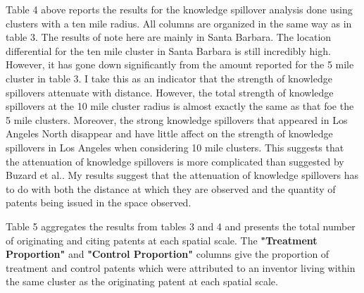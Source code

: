 \documentclass[12pt,letterpaper]{article}
\begin{document}
Table 4 above reports the results for the knowledge spillover analysis done using clusters with a ten mile radius. All columns are organized in the same way as in table 3. The results of note here are mainly in Santa Barbara. The location differential for the ten mile cluster in Santa Barbara is still incredibly high. However, it has gone down significantly from the amount reported for the 5 mile cluster in table 3. I take this as an indicator that the strength of knowledge spillovers attenuate with distance. However, the total strength of knowledge spillovers at the 10 mile cluster radius is almost exactly the same as that foe the 5 mile clusters. Moreover, the strong knowledge spillovers that appeared in Los Angeles North disappear and have little affect on the strength of knowledge spillovers in Los Angeles when considering 10 mile clusters. This suggests that the attenuation of knowledge spillovers is more complicated than suggested by Buzard et al.. My results suggest that the attenuation of knowledge spillovers has to do with both the distance at which they are observed and the quantity of patents being issued in the space observed. 
\begin{table}[H]
\centering
{}
\caption{}
\label{tab:5}
\end{table}
Table 5 aggregates the results from tables 3 and 4 and presents the total number of originating and citing patents at each spatial scale. The \textbf{"Treatment Proportion"} and \textbf{"Control Proportion"} columns give the proportion of treatment and control patents which were attributed to an inventor living within the same cluster as the originating patent at each spatial scale. 
\end{document}
